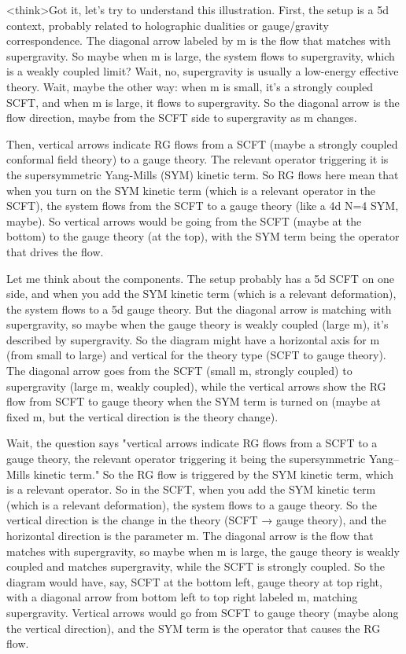 <think>Got it, let's try to understand this illustration. First, the setup is a 5d context, probably related to holographic dualities or gauge/gravity correspondence. The diagonal arrow labeled by m is the flow that matches with supergravity. So maybe when m is large, the system flows to supergravity, which is a weakly coupled limit? Wait, no, supergravity is usually a low-energy effective theory. Wait, maybe the other way: when m is small, it's a strongly coupled SCFT, and when m is large, it flows to supergravity. So the diagonal arrow is the flow direction, maybe from the SCFT side to supergravity as m changes.

Then, vertical arrows indicate RG flows from a SCFT (maybe a strongly coupled conformal field theory) to a gauge theory. The relevant operator triggering it is the supersymmetric Yang-Mills (SYM) kinetic term. So RG flows here mean that when you turn on the SYM kinetic term (which is a relevant operator in the SCFT), the system flows from the SCFT to a gauge theory (like a 4d N=4 SYM, maybe). So vertical arrows would be going from the SCFT (maybe at the bottom) to the gauge theory (at the top), with the SYM term being the operator that drives the flow.

Let me think about the components. The setup probably has a 5d SCFT on one side, and when you add the SYM kinetic term (which is a relevant deformation), the system flows to a 5d gauge theory. But the diagonal arrow is matching with supergravity, so maybe when the gauge theory is weakly coupled (large m), it's described by supergravity. So the diagram might have a horizontal axis for m (from small to large) and vertical for the theory type (SCFT to gauge theory). The diagonal arrow goes from the SCFT (small m, strongly coupled) to supergravity (large m, weakly coupled), while the vertical arrows show the RG flow from SCFT to gauge theory when the SYM term is turned on (maybe at fixed m, but the vertical direction is the theory change).

Wait, the question says "vertical arrows indicate RG flows from a SCFT to a gauge theory, the relevant operator triggering it being the supersymmetric Yang--Mills kinetic term." So the RG flow is triggered by the SYM kinetic term, which is a relevant operator. So in the SCFT, when you add the SYM kinetic term (which is a relevant deformation), the system flows to a gauge theory. So the vertical direction is the change in the theory (SCFT → gauge theory), and the horizontal direction is the parameter m. The diagonal arrow is the flow that matches with supergravity, so maybe when m is large, the gauge theory is weakly coupled and matches supergravity, while the SCFT is strongly coupled. So the diagram would have, say, SCFT at the bottom left, gauge theory at top right, with a diagonal arrow from bottom left to top right labeled m, matching supergravity. Vertical arrows would go from SCFT to gauge theory (maybe along the vertical direction), and the SYM term is the operator that causes the RG flow.

